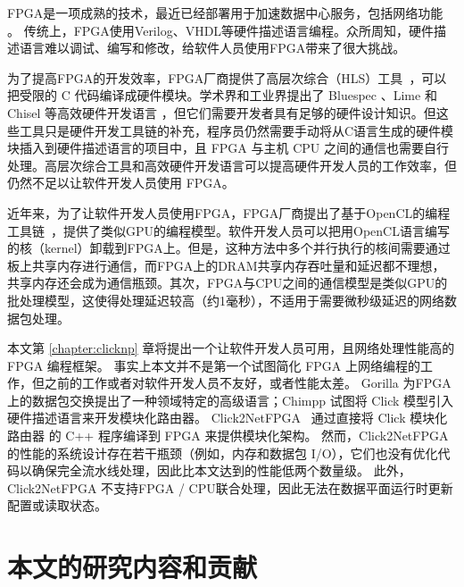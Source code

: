 FPGA是一项成熟的技术，最近已经部署用于加速数据中心服务，包括网络功能 \cite {putnam2014reconfigurable,smartnic,rubow2010chimpp,lavasani2012compiling}。
传统上，FPGA使用Verilog、VHDL等硬件描述语言编程。众所周知，硬件描述语言难以调试、编写和修改，给软件人员使用FPGA带来了很大挑战。

为了提高FPGA的开发效率，FPGA厂商提供了高层次综合（HLS）工具~\cite{vivado,intel-hls}，可以把受限的 C 代码编译成硬件模块。学术界和工业界提出了 Bluespec \cite{bluespec}、Lime \cite{auerbach2010lime} 和 Chisel \cite{bachrach2012chisel} 等高效硬件开发语言 \cite{bacon2013fpga,singh2011implementing,wester2015transformation}，但它们需要开发者具有足够的硬件设计知识。但这些工具只是硬件开发工具链的补充，程序员仍然需要手动将从C语言生成的硬件模块插入到硬件描述语言的项目中，且 FPGA 与主机 CPU 之间的通信也需要自行处理。高层次综合工具和高效硬件开发语言可以提高硬件开发人员的工作效率，但仍然不足以让软件开发人员使用 FPGA。

近年来，为了让软件开发人员使用FPGA，FPGA厂商提出了基于OpenCL的编程工具链~\cite{aoc,sdaccel}，提供了类似GPU的编程模型。软件开发人员可以把用OpenCL语言编写的核（kernel）卸载到FPGA上。但是，这种方法中多个并行执行的核间需要通过板上共享内存进行通信，而FPGA上的DRAM共享内存吞吐量和延迟都不理想，共享内存还会成为通信瓶颈。其次，FPGA与CPU之间的通信模型是类似GPU的批处理模型，这使得处理延迟较高（约1毫秒），不适用于需要微秒级延迟的网络数据包处理。

本文第 \ref{chapter:clicknp} 章将提出一个让软件开发人员可用，且网络处理性能高的 FPGA 编程框架。
事实上本文并不是第一个试图简化 FPGA 上网络编程的工作，但之前的工作或者对软件开发人员不友好，或者性能太差。
Gorilla \cite {lavasani2012compiling} 为FPGA上的数据包交换提出了一种领域特定的高级语言；Chimpp \cite {rubow2010chimpp} 试图将 Click 模型引入硬件描述语言来开发模块化路由器。
Click2NetFPGA~\cite {Click2NetFPGA} 通过直接将 Click 模块化路由器 \cite {kohler2000click} 的 C++ 程序编译到 FPGA 来提供模块化架构。
然而，Click2NetFPGA 的性能的系统设计存在若干瓶颈（例如，内存和数据包 I/O），它们也没有优化代码以确保完全流水线处理，因此比本文达到的性能低两个数量级。
此外，Click2NetFPGA 不支持FPGA / CPU联合处理，因此无法在数据平面运行时更新配置或读取状态。








\section{本文的研究内容和贡献}


